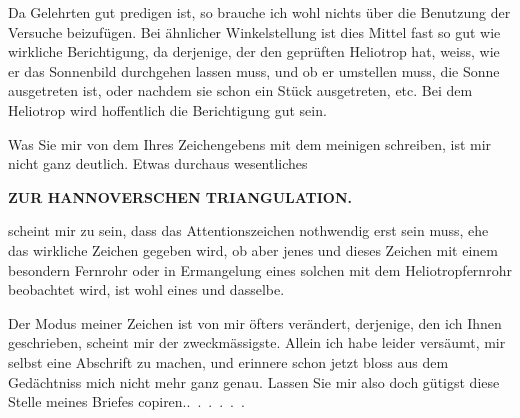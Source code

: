Da Gelehrten gut predigen ist, so brauche ich wohl nichts über die Benutzung der Versuche beizufügen.
Bei ähnlicher Winkelstellung ist dies Mittel fast so gut wie wirkliche Berichtigung, da derjenige, der den geprüften Heliotrop hat, weiss, wie er das Sonnenbild durchgehen lassen muss, und ob er umstellen muss,  die Sonne ausgetreten ist, oder nachdem sie schon ein Stück ausgetreten, etc.
Bei dem  Heliotrop wird hoffentlich die Berichtigung gut sein.
\par\noindent\hspace*{\parindent}Was Sie mir von dem  Ihres Zeichengebens mit dem meinigen schreiben, ist mir nicht ganz deutlich.
Etwas durchaus wesentliches
\par\clearpage
\noindent\null\hfill{\small\textbf{ZUR HANNOVERSCHEN TRIANGULATION.}}\hfill{}\par\medskip
\noindent scheint mir zu sein, dass das Attentionszeichen nothwendig erst  sein muss, ehe das wirkliche Zeichen gegeben wird, ob aber jenes und dieses Zeichen mit einem besondern Fernrohr oder in Ermangelung eines solchen mit dem Heliotropfernrohr beobachtet wird, ist wohl eines und dasselbe.
\par\noindent\hspace*{\parindent}Der Modus meiner Zeichen ist von mir öfters verändert, derjenige, den ich Ihnen geschrieben, scheint mir der zweckmässigste.
Allein ich habe leider versäumt, mir selbst eine Abschrift zu machen, und erinnere schon jetzt bloss aus dem Gedächtniss mich nicht mehr ganz genau.
Lassen Sie mir also doch gütigst diese Stelle meines Briefes \mbox{copiren.\quad.\ .\ .\ .\ .\ .}
\par
\endgroup
